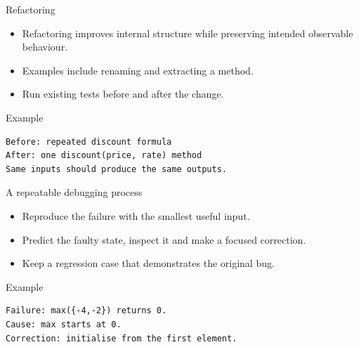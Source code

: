 \documentclass[10pt,aspectratio=169]{beamer}
\begin{document}
\begin{frame}[fragile,t]{Refactoring}
\begin{itemize}
\item Refactoring improves internal structure while preserving intended observable behaviour.
\item Examples include renaming and extracting a method.
\item Run existing tests before and after the change.
\end{itemize}
\vspace{1mm}\begin{block}{Example}
\begin{lstlisting}
Before: repeated discount formula
After: one discount(price, rate) method
Same inputs should produce the same outputs.
\end{lstlisting}
\end{block}
\end{frame}

\begin{frame}[fragile,t]{A repeatable debugging process}
\begin{itemize}
\item Reproduce the failure with the smallest useful input.
\item Predict the faulty state, inspect it and make a focused correction.
\item Keep a regression case that demonstrates the original bug.
\end{itemize}
\vspace{1mm}\begin{block}{Example}
\begin{lstlisting}
Failure: max({-4,-2}) returns 0.
Cause: max starts at 0.
Correction: initialise from the first element.
\end{lstlisting}
\end{block}
\end{frame}
\end{document}
